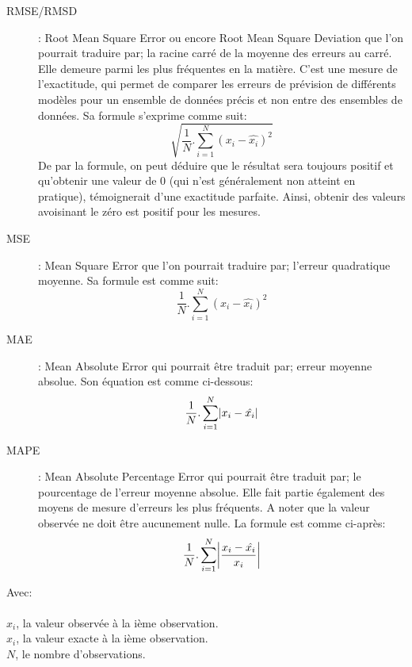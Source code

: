 \documentclass[a4paper, 12pt]{book}
\begin{document}
\begin{description}
	\item[RMSE/RMSD]: Root Mean Square Error ou encore Root Mean Square Deviation que l'on pourrait traduire par; la racine carré de la moyenne des erreurs au carré. Elle demeure parmi les plus fréquentes en la matière. C'est une mesure de l'exactitude, qui permet de comparer les erreurs de prévision de différents modèles pour un ensemble de données précis et non entre des ensembles de données. Sa formule s'exprime comme suit:
	\begin{equation}
		\sqrt{\frac{1}{N}.\sum_{i = 1}^{N}(x_i - \hat{x_i})^2}
	\end{equation}	
De par la formule, on peut déduire que le résultat sera toujours positif et qu'obtenir une valeur de 0 (qui n'est généralement non atteint en pratique), témoignerait d'une exactitude parfaite. Ainsi, obtenir des valeurs avoisinant le zéro est positif pour les mesures.
	\item[MSE]: Mean Square Error que l'on pourrait traduire par; l'erreur quadratique moyenne. Sa formule est comme suit:
	\begin{equation}
		\frac{1}{N}.\sum_{i = 1}^{N}(x_i - \hat{x_i})^2
	\end{equation}
	
	\item[MAE]: Mean Absolute Error qui pourrait être traduit par; erreur moyenne absolue. Son équation est comme ci-dessous:
	\begin{equation}
		\frac{1}{N}.\sum_{i = 1}^{N} \abs{x_i - \hat{x_i}}
	\end{equation}	 
	\item[MAPE]: Mean Absolute Percentage Error qui pourrait être traduit par; le pourcentage de l'erreur moyenne absolue. Elle fait partie également des moyens de mesure d'erreurs les plus fréquents. A noter que la valeur observée ne doit être aucunement nulle. La formule est comme ci-après:
	\begin{equation}		
		\frac{1}{N}.\sum_{i = 1}^{N} \abs{\frac{x_i - \hat{x_i}}{x_i}}
	\end{equation}
\end{description}


Avec: \\ \\
$x_i$, la valeur observée à la ième observation. \\
$\hat{x}_i$, la valeur exacte à la ième observation. \\
$N$, le nombre d'observations.
\end{document}
